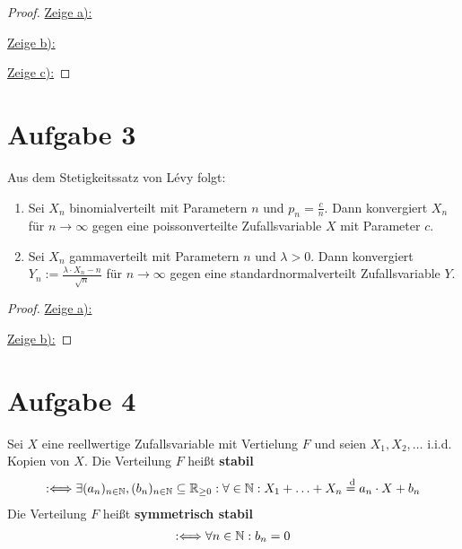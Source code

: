 \documentclass[12pt,a4paper]{article}
\begin{document}
\begin{proof}
	\underline{Zeige a):}
	
	\underline{Zeige b):}
	
	\underline{Zeige c):}
		
\end{proof}

\section*{Aufgabe 3}
Aus dem Stetigkeitssatz von Lévy folgt:
\begin{enumerate}[label=\alph*)]
	\item Sei $X_n$ binomialverteilt mit Parametern $n$ und $p_n=\frac{c}{n}$.
	Dann konvergiert $X_n$ für $n\to\infty$ gegen eine poissonverteilte Zufallsvariable $X$ mit Parameter $c$.
	\item Sei $X_n$ gammaverteilt mit Parametern $n$ und $\lambda>0$.
	Dann konvergiert $Y_n:=\frac{\lambda\cdot X_n-n}{\sqrt{n}}$ für $n\to\infty$ gegen eine standardnormalverteilt Zufallsvariable $Y$.
\end{enumerate}

\begin{proof}
	\underline{Zeige a):}
	
	\underline{Zeige b):}
\end{proof}

\section*{Aufgabe 4}
Sei $X$ eine reellwertige Zufallsvariable mit Vertielung $F$ und seien $X_1,X_2,\ldots$ i.i.d. Kopien von $X$.
Die Verteilung $F$ heißt \textbf{stabil}
\begin{align*}
	:\Longleftrightarrow
	\exists(a_n)_{n\in\mathbb{N}},(b_n)_{n\in\mathbb{N}}\subseteq\mathbb{R}_{\geq0}:\forall\in\mathbb{N}:
	X_1+\ldots+X_n\overset{\text{ d}}{=}a_n\cdot X+b_n
\end{align*}
Die Verteilung $F$ heißt \textbf{symmetrisch stabil}
\begin{align*}
	:\Longleftrightarrow
	\forall n\in\mathbb{N}:b_n=0
\end{align*}
\end{document}
